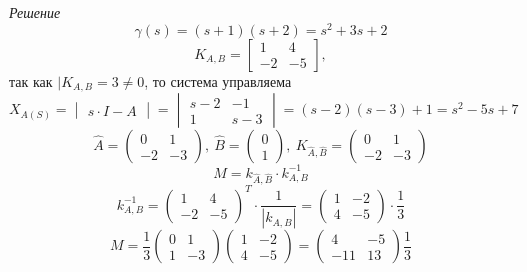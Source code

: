 \documentclass[../../TAU.tex]{subfiles}
\begin{document}
    {\it Решение}
    $$
        \gamma(s)=(s+1)(s+2)=s^2+3s+2
    $$
    $$
        K_{A,B} = 
        \begin{bmatrix}
            1 & 4\\
            -2 & -5
        \end{bmatrix}
        ,
    $$
    так как $|K_{A,B}=3\neq0$, то система управляема
    $$
        X_{A(S)}=
        \begin{vmatrix}
            s\cdot I - A
        \end{vmatrix}
        =
        \begin{vmatrix}
            s-2 & -1\\
            1 & s-3
        \end{vmatrix}
        =(s-2)(s-3)+1 = s^2-5s+7
    $$
    $$
        \widehat A =
        \begin{pmatrix}
            0 & 1\\
            -2 & -3
        \end{pmatrix},\ 
        \widehat B=
        \begin{pmatrix}
            0 \\ 1
        \end{pmatrix},\ 
        K_{\widehat A,\widehat B} = 
        \begin{pmatrix}
            0 & 1\\
            -2 & -3
        \end{pmatrix}
    $$
    $$
        M = k_{\widehat A, \widehat B}\cdot k^{-1}_{A,B}
    $$
    $$
        k^{-1}_{A,B}=
        \begin{pmatrix}
            1 & 4\\
            -2 & -5
        \end{pmatrix}^{T}\cdot
        \frac{1}{|k_{A, B}|}
        =
        \begin{pmatrix}
            1 & -2\\
            4 & -5
        \end{pmatrix}\cdot
        \frac{1}{3}        
    $$
    $$
        M=\frac{1}{3}  
        \begin{pmatrix}
            0 & 1\\
            1 & -3
        \end{pmatrix}
        \begin{pmatrix}
            1 & -2\\
            4 & -5
        \end{pmatrix}
        =
        \begin{pmatrix}
            4 & -5\\
            -11 & 13
        \end{pmatrix}
        \frac{1}{3}  
    $$
\end{document}
